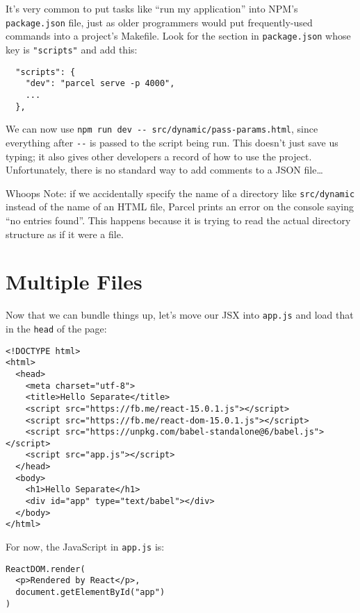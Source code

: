It's very common to put tasks like ``run my application'' into NPM's \texttt{package.json} file,
just as older programmers would put frequently-used commands into a project's Makefile.
Look for the section in \texttt{package.json} whose key is \texttt{"scripts"} and add this:

\begin{verbatim}
  "scripts": {
    "dev": "parcel serve -p 4000",
    ...
  },
\end{verbatim}

We can now use \texttt{npm\ run\ dev\ -\/-\ src/dynamic/pass-params.html},
since everything after \texttt{-\/-} is passed to the script being run.
This doesn't just save us typing;
it also gives other developers a record of how to use the project.
Unfortunately,
there is no standard way to add comments to a JSON file{\ldots}

\begin{aside}{Whoops}
  Note:
  if we accidentally specify the name of a directory like \texttt{src/dynamic}
  instead of the name of an HTML file,
  Parcel prints an error on the console saying ``no entries found''.
  This happens because it is trying to read the actual directory structure
  as if it were a file.
\end{aside}

\section{Multiple Files}\label{s:dynamic-multiple}

Now that we can bundle things up,
let's move our JSX into \texttt{app.js} and load that in the \texttt{head} of the page:

\begin{verbatim}
<!DOCTYPE html>
<html>
  <head>
    <meta charset="utf-8">
    <title>Hello Separate</title>
    <script src="https://fb.me/react-15.0.1.js"></script>
    <script src="https://fb.me/react-dom-15.0.1.js"></script>
    <script src="https://unpkg.com/babel-standalone@6/babel.js"></script>
    <script src="app.js"></script>
  </head>
  <body>
    <h1>Hello Separate</h1>
    <div id="app" type="text/babel"></div>
  </body>
</html>
\end{verbatim}

For now,
the JavaScript in \texttt{app.js} is:

\begin{verbatim}
ReactDOM.render(
  <p>Rendered by React</p>,
  document.getElementById("app")
)
\end{verbatim}

